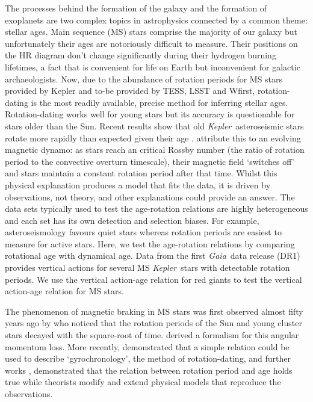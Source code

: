 \documentclass[useAMS, usenatbib, preprint, 12pt]{aastex}
\newcommand{\Kepler}{{\it Kepler}}
\newcommand{\kepler}{\Kepler}
\newcommand{\Gaia}{{\it Gaia}}
\newcommand{\eg}{{\it e.g.}}
\begin{document}
The processes behind the formation of the galaxy and the formation of
exoplanets are two complex topics in astrophysics connected by a common theme:
stellar ages.
Main sequence (MS) stars comprise the majority of our galaxy but unfortunately
    their ages are notoriously difficult to measure.
Their positions on the HR diagram don't change significantly during their
    hydrogen burning lifetimes, a fact that is convenient for life on Earth
    but inconvenient for galactic archaeologists.
Now, due to the abundance of rotation periods for MS stars provided by Kepler
    and to-be provided by TESS, LSST and Wfirst, rotation-dating is the most
    readily available, precise method for inferring stellar ages.
Rotation-dating works well for young stars but its accuracy is questionable
for stars older than the Sun.
Recent results show that old \kepler\ asteroseismic stars rotate more rapidly
    than expected given their age \citep[\eg][]{Angus2015, Vansaders2016,
    Metcalfe2016}.
\citet{Vansaders2016} attribute this to an evolving magnetic dynamo: as stars
reach an critical Rossby number (the ratio of rotation period to the
convective overturn timescale), their magnetic field `switches off' and stars
maintain a constant rotation period after that time.
Whilst this physical explanation produces a model that fits the data, it
    is driven by observations, not theory, and other explanations could
    provide an answer.
The data sets typically used to test the age-rotation relations are highly
    heterogeneous and each set has its own detection and selection biases.
For example, asteroseismology favours quiet stars whereas rotation periods are
    easiest to measure for active stars.
Here, we test the age-rotation relations by comparing rotational age with
    dynamical age.
Data from the first \Gaia\ data release (DR1) provides vertical actions for
    several MS \Kepler\ stars with detectable rotation periods.
We use the vertical action-age relation for red giants to test the
    vertical action-age relation for MS stars.

The phenomenon of magnetic braking in MS stars was first observed almost fifty
years ago by \citet{Skumanich1972} who noticed that the rotation periods of
the Sun and young cluster stars decayed with the square-root of time.
\citet{Kawaler1988} derived a formalism for this angular momentum loss.
More recently, \citet{Barnes2003} demonstrated that a simple relation could be
used to describe `gyrochronology', the method of rotation-dating, and further
works \citep[\eg][]{Barnes2007, Mamajek2008, Barnes2010, Meibom2011},
demonstrated that the relation between rotation period and age holds true
while theorists \citep[\eg][]{Matt2012, Epstein2014, Vansaders2013,
Vansaders2015} modify and extend physical models that reproduce the
observations.
\end{document}
